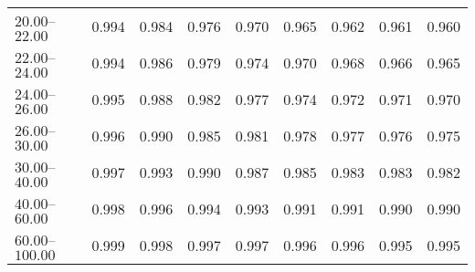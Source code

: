 \begin{table}[htp]
\begin{tiny}
\begin{center}
\begin{tabular}{|l|c|c|c|c|c|c|c|c|}
$20.00$--$22.00$ & 0.994 & 0.984 & 0.976 & 0.970 & 0.965 & 0.962 & 0.961 & 0.960  \\
$22.00$--$24.00$ & 0.994 & 0.986 & 0.979 & 0.974 & 0.970 & 0.968 & 0.966 & 0.965  \\
$24.00$--$26.00$ & 0.995 & 0.988 & 0.982 & 0.977 & 0.974 & 0.972 & 0.971 & 0.970  \\
$26.00$--$30.00$ & 0.996 & 0.990 & 0.985 & 0.981 & 0.978 & 0.977 & 0.976 & 0.975  \\
$30.00$--$40.00$ & 0.997 & 0.993 & 0.990 & 0.987 & 0.985 & 0.983 & 0.983 & 0.982  \\
$40.00$--$60.00$ & 0.998 & 0.996 & 0.994 & 0.993 & 0.991 & 0.991 & 0.990 & 0.990  \\
$60.00$--$100.00$ & 0.999 & 0.998 & 0.997 & 0.997 & 0.996 & 0.996 & 0.995 & 0.995  \\
\hline
\end{tabular} 
             \end{center} 
             \end{tiny} 
             \label{tab:sa_offN_jpsi} 
             \end{table}


